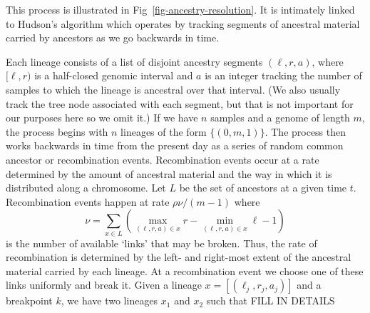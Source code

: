 \documentclass{article}
\begin{document}
This process is illustrated in Fig~\ref{fig-ancestry-resolution}. It is intimately linked to
Hudson's algorithm which operates by
tracking segments of ancestral material carried by ancestors as
we go backwards in time.

%
Each lineage consists of a list of
disjoint ancestry segments $(\ell, r, a)$, where
$[\ell, r)$ is a half-closed genomic interval and $a$ is an integer
tracking the number of samples to which the lineage is ancestral over that interval.
(We also usually track the tree node associated with each segment, but
that is not important for our purposes here so we omit it.)
If we have $n$ samples and a genome of length $m$, the process begins with $n$ lineages
of the form $\{(0, m, 1)\}$. The process then works backwards in time from
the present day as a series of random common ancestor or recombination events.
Recombination events occur at a rate determined by the amount of ancestral material and
the way in which it is distributed along a chromosome.
Let $L$ be the set of ancestors at a given time $t$. Recombination events
happen at rate $\rho \nu / (m - 1)$ where
\[
\nu = \sum_{x \in L}\left( \max_{(\ell, r, a) \in x}r
    - \min_{(\ell, r, a) \in x}\ell - 1 \right)
\]
is the number of available `links' that may be broken. Thus, the rate of
recombination is determined by the left- and right-most extent of the
ancestral material carried by each lineage. At a recombination
event we choose one of these links uniformly and break it. Given a lineage
$x = [(\ell_j, r_j, a_j)]$ and a breakpoint $k$, we have two lineages
$x_1$ and $x_2$ such that FILL IN DETAILS
\end{document}
